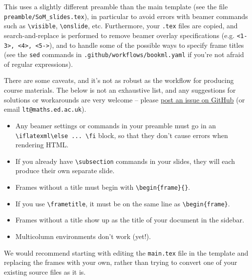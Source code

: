 This uses a slightly different preamble than the main template (see the file \verb|preamble/SoM_slides.tex|), in particular to avoid errors with beamer commands such as \verb|\visible|, \verb|\onslide|, etc. Furthermore, your \verb|.tex| files are copied, and search-and-replace is performed to remove beamer overlay specifications (e.g. \verb|<1-3>, <4>, <5->|), and to handle some of the possible ways to specify frame titles (see the \verb|sed| commands in \verb|.github/workflows/bookml.yaml| if you're not afraid of regular expressions).

There are some caveats, and it's not as robust as the workflow for producing course materials. The below is not an exhaustive list, and any suggestions for solutions or workarounds are very welcome -- please \href{https://github.com/UoE-School-of-Mathematics/Workflow-Template-Slides/issues}{post an issue on GitHub} (or email \texttt{lt@maths.ed.ac.uk}).

\begin{itemize}
    \item Any beamer settings or commands in your preamble must go in an \verb|\iflatexml\else ... \fi| block, so that they don't cause errors when rendering HTML.
    \item If you already have \verb|\subsection| commands in your slides, they will each produce their own separate slide.
    \item Frames without a title must begin with \verb|\begin{frame}{}|.
    \item If you use \verb|\frametitle|, it must be on the same line as \verb|\begin{frame}|.
    \item Frames without a title show up as the title of your document in the sidebar.
    \item Multicolumn environments don't work (yet!).
\end{itemize}

We would recommend starting with editing the \verb|main.tex| file in the template and replacing the frames with your own, rather than trying to convert one of your existing source files as it is.
